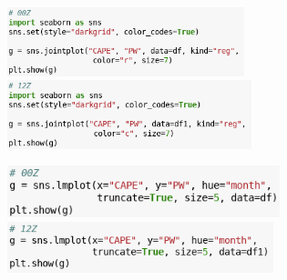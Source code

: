 \documentclass[12pt]{article}
\begin{document}
\begin{center}
	\includegraphics[height=2cm]{111.png} \hspace*{\fill}
    \includegraphics[height=2cm]{222.png}
\end{center}
\begin{center}
	\includegraphics[height=1.5cm]{1111.png} \hspace*{\fill}
    \includegraphics[height=1.5cm]{2222.png}
\end{center}
\end{document}
